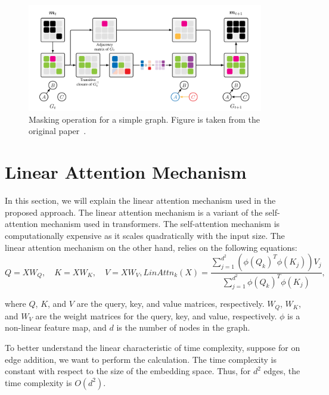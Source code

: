 \documentclass{lxaiproposal}
\begin{document}
    \begin{figure}[h]
        \centering
        \includegraphics[width=0.92\textwidth]{figures/masking}
        \caption{Masking operation for a simple graph. Figure is taken from the original paper~\cite{deleu2022daggflownet}.}
        \label{fig:masking}
    \end{figure}


    \section{Linear Attention Mechanism}\label{app:linear_attention}
    \vspace*{-3mm}

    In this section, we will explain the linear attention mechanism used in the proposed approach. The linear attention
    mechanism is a variant of the self-attention mechanism used in transformers. The self-attention mechanism is
    computationally expensive as it scales quadratically with the input size. The linear attention mechanism on the
    other hand, relies on the following equations:
    \begin{equation}
        Q = XW_Q, \quad K = XW_K, \quad V = XW_V, LinAttn_k(X) = \frac{\sum_{j=1}^{d^2}
            \left(\phi(Q_k)^T\phi(K_j)\right)V_j}{\sum_{j=1}^{d^2} \phi(Q_k)^T\phi(K_j)},
        \label{eq:linear_attention}
    \end{equation}

    where $Q$, $K$, and $V$ are the query, key, and value matrices, respectively. $W_Q$, $W_K$, and $W_V$ are the
    weight matrices for the query, key, and value, respectively. $\phi$ is a non-linear feature map, and $d$ is the
    number of nodes in the graph.

    To better understand the linear characteristic of time complexity, suppose for on edge addition, we want to
    perform the calculation. The time complexity is constant with respect to the size of the embedding space. Thus,
    for $d^2$ edges, the time complexity is $O(d^2)$.
\end{document}

